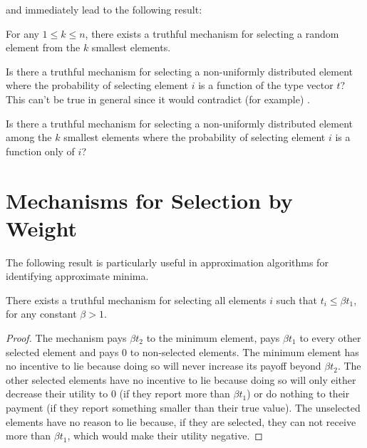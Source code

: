 \documentclass{article}
\begin{document}
 and  immediately lead to the
following result:

\begin{cor}
For any $1\le k\le n$, there exists a truthful mechanism for selecting
a random element from the $k$ smallest elements.
\end{cor}


\begin{op}
Is there a truthful mechanism for selecting a non-uniformly
distributed element where the probability of selecting element $i$ is
a function of the type vector $t$?  This can't be true in general
since it would contradict (for example) .
\end{op}

\begin{op}
Is there a truthful mechanism for selecting a non-uniformly
distributed element among the $k$ smallest elements where the
probability of selecting element $i$ is a function only of $i$?
\end{op}

\section{Mechanisms for Selection by Weight}

The following result is particularly useful in approximation
algorithms for identifying approximate minima.

\begin{thm}
There exists a truthful mechanism for selecting all elements $i$ such
that $t_i \le \beta t_1$, for any constant $\beta > 1$.
\end{thm}

\begin{proof}
The mechanism pays $\beta t_2$ to the minimum element, pays $\beta
t_1$ to every other selected element and pays 0 to non-selected
elements.  The minimum element has no incentive to lie because doing
so will never increase its payoff beyond $\beta t_2$.  The other
selected elements have no incentive to lie because doing so will only
either decrease their utility to 0 (if they report more than $\beta
t_1$) or do nothing to their payment (if they report something smaller
than their true value).   The unselected elements have no reason to
lie because, if they are selected, they can not receive more than
$\beta t_1$, which would make their utility negative.
\end{proof}
\end{document}
